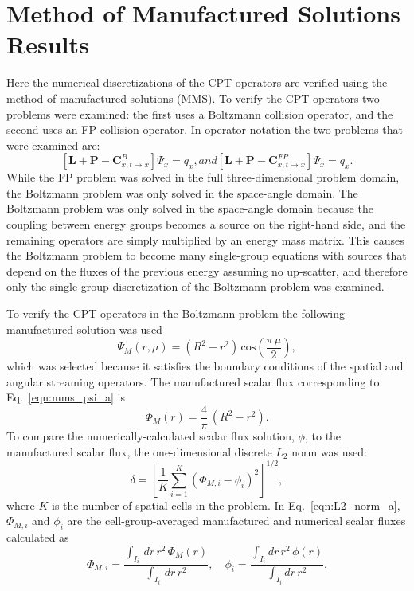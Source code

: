 \documentclass[../main.tex]{subfiles}
\begin{document}
\chapter{Method of Manufactured Solutions Results}
Here the numerical discretizations of the CPT operators are verified using the method of manufactured solutions (MMS). To verify the CPT operators two problems were examined: the first uses a Boltzmann collision operator, and the second uses an FP collision operator. In operator notation the two problems that were examined are:
\begin{subequations} \label{eqn:L2_problems}
  \begin{equation} 
    \left[ \boldsymbol{L} + \boldsymbol{P} - \boldsymbol{C}^B_{x,t\rightarrow x} \right] \Psi_x = q_x,
  \end{equation}
  and
  \begin{equation}
    \left[ \boldsymbol{L} + \boldsymbol{P} - \boldsymbol{C}^{FP}_{x,t\rightarrow x} \right] \Psi_x = q_x.
  \end{equation}
\end{subequations}
While the FP problem was solved in the full three-dimensional problem domain, the Boltzmann problem was only solved in the space-angle domain. The Boltzmann problem was only solved in the space-angle domain because the coupling between energy groups becomes a source on the right-hand side, and the remaining operators are simply multiplied by an energy mass matrix. This causes the Boltzmann problem to become many single-group equations with sources that depend on the fluxes of the previous energy assuming no up-scatter, and therefore only the single-group discretization of the Boltzmann problem was examined.

To verify the CPT operators in the Boltzmann problem the following manufactured solution was used
\begin{equation} \label{eqn:mms_psi_a}
  \Psi_M(r,\mu) = \left( R^2 - r^2 \right) \, \text{cos}\left(\frac{\pi \, \mu}{2}\right),
\end{equation}
which was selected because it satisfies the boundary conditions of the spatial and angular streaming operators. The manufactured scalar flux corresponding to Eq.~\eqref{eqn:mms_psi_a} is
\begin{equation}
  \Phi_M(r) = \dfrac{4}{\pi} \, \left( R^2 - r^2 \right).
\end{equation}
To compare the numerically-calculated scalar flux solution, $\phi$, to the manufactured scalar flux, the one-dimensional discrete $L_2$ norm was used:
\begin{equation} \label{eqn:L2_norm_a}
  \delta = \left[ \dfrac{1}{K} \sum_{i=1}^K \left(\Phi_{M,i} - \phi_{i} \right)^2 \right]^{1/2},
\end{equation}
where $K$ is the number of spatial cells in the problem. In Eq.~\eqref{eqn:L2_norm_a}, $\Phi_{M,i}$ and $\phi_{i}$ are the cell-group-averaged manufactured and numerical scalar fluxes calculated as
\begin{equation}
  \Phi_{M,i} = \frac{ \int_{I_i} \, dr \, r^2 \, \Phi_M(r) }{ \int_{I_i} \, dr \, r^2  }, \quad \phi_{i} = \frac{ \int_{I_i} dr \, r^2 \, \phi(r) }{ \int_{I_i} dr \, r^2 }.
\end{equation}
\end{document}
